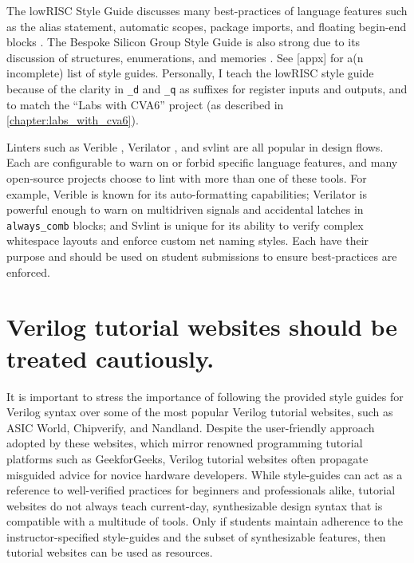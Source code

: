 The lowRISC Style Guide discusses many best-practices of language features such as the alias statement, automatic scopes, package imports, and floating begin-end blocks \cite{lowRISCstyleguides}. The Bespoke Silicon Group Style Guide is also strong due to its discussion of structures, enumerations, and memories \cite{BSGstyleguide}. See [appx] for a(n incomplete) list of style guides. Personally, I teach the lowRISC style guide because of the clarity in \texttt{_d} and \texttt{_q} as suffixes for register inputs and outputs, and to match the ``Labs with CVA6'' project (as described in \autoref{chapter:labs_with_cva6}).

Linters such as Verible \cite{veribleGitHub}, Verilator \cite{verilatorGitHub}, and svlint \cite{svlintGitHub} are all popular in design flows. Each are configurable to warn on or forbid specific language features, and many open-source projects choose to lint with more than one of these tools. For example, Verible is known for its auto-formatting capabilities; Verilator is powerful enough to warn on multidriven signals and accidental latches in \texttt{always_comb} blocks; and Svlint is unique for its ability to verify complex whitespace layouts and enforce custom net naming styles. Each have their purpose and should be used on student submissions to ensure best-practices are enforced.

\section{Verilog tutorial websites should be treated cautiously.}

It is important to stress the importance of following the provided style guides for Verilog syntax over some of the most popular Verilog tutorial websites, such as ASIC World, Chipverify, and Nandland. Despite the user-friendly approach adopted by these websites, which mirror renowned programming tutorial platforms such as GeekforGeeks, Verilog tutorial websites often propagate misguided advice for novice hardware developers. While style-guides can act as a reference to well-verified practices for beginners and professionals alike, tutorial websites do not always teach current-day, synthesizable design syntax that is compatible with a multitude of tools. Only if students maintain adherence to the instructor-specified style-guides and the subset of synthesizable features, then tutorial websites can be used as resources.

